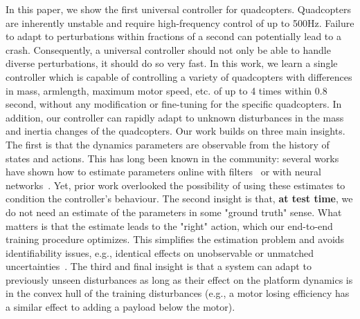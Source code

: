 In this paper, we show the first universal controller for quadcopters. 
%
Quadcopters are inherently unstable and require high-frequency control of up to 500Hz. 
%
Failure to adapt to perturbations within fractions of a second can potentially lead to a crash.
%
Consequently, a universal controller should not only be able to handle diverse perturbations, it should do so very fast. 
%
In this work, we learn a single controller which is capable of controlling a variety of quadcopters with differences in mass, armlength, maximum motor speed, etc. of up to 4 times within 0.8 second, without any modification or fine-tuning for the specific quadcopters. 
%
In addition, our controller can rapidly adapt to unknown disturbances in the mass and inertia changes of the quadcopters.
%
Our work builds on three main insights.
%
The first is that the dynamics parameters are observable from the history of states and actions.
%
This has long been known in the community: several works have shown how to estimate parameters online with filters~\cite{svacha2020imu,wuest2019online} or with neural networks~\cite{forgione2021continuous}.
%
Yet, prior work overlooked the possibility of using these estimates to condition the controller's behaviour.
%
The second insight is that, \textbf{at test time}, we do not need an estimate of the parameters in some "ground truth" sense.
%
What matters is that the estimate leads to the "right" action, which our end-to-end training procedure optimizes.
%
This simplifies the estimation problem and avoids identifiability issues, e.g., identical effects on unobservable or unmatched uncertainties~\cite{hovakimyan2010l1}.
%
%
The third and final insight is that a system can adapt to previously unseen disturbances as long as their effect on the platform dynamics is in the convex hull of the training disturbances (e.g., a motor losing efficiency has a similar effect to adding a payload below the motor).

